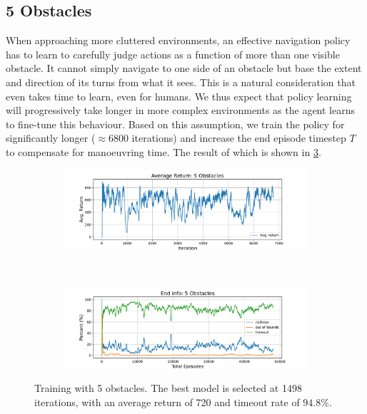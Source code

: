 \subsection{5 Obstacles}
\label{subsec:7_5_obstacles}
When approaching more cluttered environments, an effective navigation policy has to learn to carefully judge actions as a function of more than one visible obstacle. It cannot simply navigate to one side of an obstacle but base the extent and direction of its turns from what it sees. This is a natural consideration that even takes time to learn, even for humans. 
We thus expect that policy learning will progressively take longer in more complex environments as the agent learns to fine-tune this behaviour. Based on this assumption, we train the policy for significantly longer ($\approx 6800$ iterations) and increase the end episode timestep $T$ to compensate for manoeuvring time. The result of which is shown in \cref{fig:7_train_nav_5_obst}.
\begin{figure}[htb]
    \centering
    \begin{subfigure}[b]{\textwidth}
        \centering
        \captionsetup{justification=centering}
        \includegraphics[width=0.99\textwidth]{figures/7_/3DCarModel_BodyObs_NavSetup_5_NewObs_v1_reward.pdf}
        \label{fig:5_obst_nav_rew}
    \end{subfigure} \\
    \begin{subfigure}[b]{\textwidth}
        \centering
        \captionsetup{justification=centering}
        \includegraphics[width=0.99\textwidth]{figures/7_/3DCarModel_BodyObs_NavSetup_5_NewObs_v1_end_info.pdf}
        \label{fig:5_obst_nav_end}
    \end{subfigure} 
    \caption{Training with 5 obstacles. The best model is selected at 1498 iterations, with an average return of 720 and timeout rate of $94.8\%$.} %
    \label{fig:7_train_nav_5_obst}
\end{figure}
